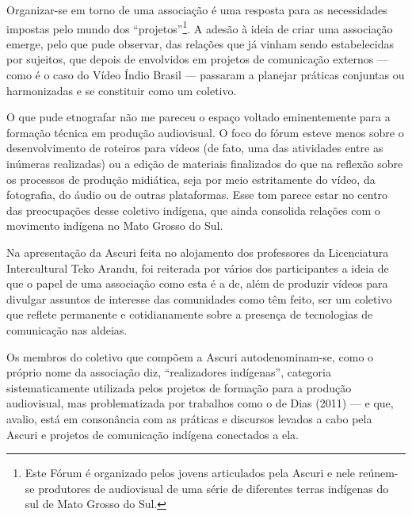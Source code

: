 {{Organizar-se em torno de uma associação é uma resposta para as
necessidades impostas pelo mundo dos ``projetos''\footnote{Este Fórum é
organizado pelos jovens articulados pela Ascuri e nele reúnem-se
produtores de audiovisual de uma série de diferentes terras indígenas
do sul de Mato Grosso do Sul. }. A adesão à ideia de criar uma
associação emerge, pelo que pude observar, das relações que já vinham
sendo estabelecidas por sujeitos, que depois de envolvidos em projetos
de comunicação externos --- como é o caso do Vídeo Índio Brasil ---
passaram a planejar práticas conjuntas ou harmonizadas e se constituir
como um coletivo.

O  que pude etnografar não me pareceu o espaço voltado eminentemente
para a formação técnica em produção audiovisual. O foco do fórum esteve
menos sobre o desenvolvimento de roteiros para vídeos (de fato, uma das
atividades entre as inúmeras realizadas) ou a edição de materiais
finalizados do que na reflexão sobre os processos de produção
midiática, seja por meio estritamente do vídeo, da fotografia, do áudio
ou de outras plataformas. Esse tom parece estar no centro das
preocupações desse coletivo indígena, que ainda consolida relações com
o movimento indígena no Mato Grosso do Sul.

Na apresentação da Ascuri feita no alojamento dos professores da
Licenciatura Intercultural Teko Arandu, foi reiterada por vários dos
participantes a ideia de que o papel de uma associação como esta é a
de, além de produzir vídeos para divulgar assuntos de interesse das
comunidades como têm feito, ser um coletivo que reflete permanente e cotidianamente
sobre a presença de tecnologias de comunicação nas aldeias.

Os membros do coletivo que compõem a Ascuri autodenominam-se, como o
próprio nome da associação diz, ``realizadores indígenas'', categoria
sistematicamente utilizada pelos projetos de formação para a produção
audiovisual, mas problematizada por trabalhos como o de Dias (2011) --- e
que, avalio, está em consonância com as práticas e discursos levados a
cabo pela Ascuri e projetos de comunicação indígena conectados a ela.

}}
